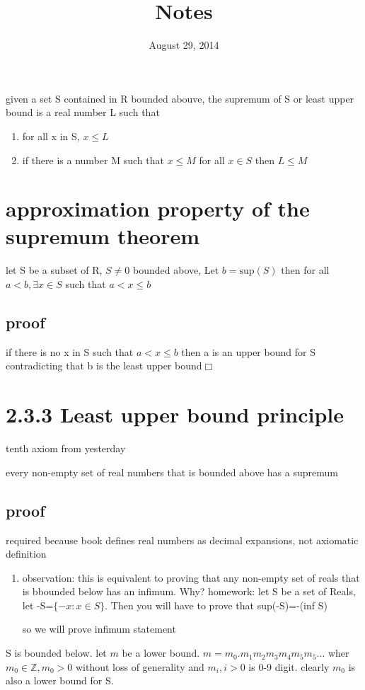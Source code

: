 \documentclass[letterpaper]{article}
\begin{document}
\title{Notes}
\date{August 29, 2014}
\maketitle

given a set S contained in R bounded abouve, the supremum of S or least upper bound is a real number L such that
\begin{enumerate}
\item
for all x in S, $x\le L$
\item
if there is a number M such that $x\le M$ for all $x\in S$ then $L\le M$
\end{enumerate}

\section*{approximation property of the supremum theorem}
let S be a subset of R, $S\ne 0$ bounded above, Let $b=\text{sup}(S)$ then for all $a<b,\exists x\in S$ such that $a<x\le b$
\subsection*{proof}
if there is no x in S such that $a<x\le b$ then a is an upper bound for S contradicting that b is the least upper bound$\Box$
\section*{2.3.3 Least upper bound principle}
tenth axiom from yesterday

every non-empty set of real numbers that is bounded above has a supremum
\subsection*{proof}
required because book defines real numbers as decimal expansions, not axiomatic definition

\begin{enumerate}
\item
observation: this is equivalent to proving that any non-empty set of reals that is bbounded below has an infimum. Why? homework: let S be a set of Reals, let -S=$\{-x:x\in S\}$. Then you will have to prove that sup(-S)=-(inf S)

so we will prove infimum statement
\end{enumerate}

S is bounded below. let $m$ be a lower bound. $m=m_0.m_1m_2m_3m_4m_5m_5...$ wher $m_0\in\mathbb{Z}, m_0>0$ without loss of generality and $m_i, i>0$ is 0-9 digit. clearly $m_0$ is also a lower bound for S.
\end{document}
